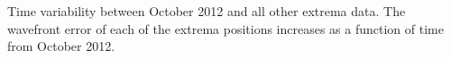 Time variability between October 2012 and all other extrema data. The wavefront error of each of the extrema positions increases as a function of time from October 2012.
\label{fig:inst_time_var}        